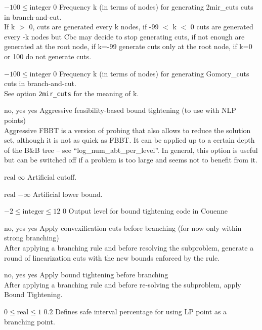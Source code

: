 %
{$-100\leq\textrm{integer}$}%
{$0$}%
{Frequency k (in terms of nodes) for generating 2mir\_cuts cuts in branch-and-cut.\\
If k $>$ 0, cuts are generated every k nodes, if -99 $<$ k $<$ 0 cuts are generated every -k nodes but Cbc may decide to stop generating cuts, if not enough are generated at the root node, if k=-99 generate cuts only at the root node, if k=0 or 100 do not generate cuts.}%
{}

%
{$-100\leq\textrm{integer}$}%
{$0$}%
{Frequency k (in terms of nodes) for generating Gomory\_cuts cuts in branch-and-cut.\\
See option \texttt{2mir\_cuts} for the meaning of k.}%
{}

%
{no, yes}%
{yes}%
{Aggressive feasibility-based bound tightening (to use with NLP points)\\
Aggressive FBBT is a version of probing that also allows to reduce the solution set, although it is not as quick as FBBT. It can be applied up to a certain depth of the B\&B tree -- see ``log\_num\_abt\_per\_level''. In general, this option is useful but can be switched off if a problem is too large and seems not to benefit from it.}%
{}

%
{$\textrm{real}$}%
{$\infty$}%
{Artificial cutoff.}%
{}

%
{$\textrm{real}$}%
{$-\infty$}%
{Artificial lower bound.}%
{}

%
{$-2\leq\textrm{integer}\leq12$}%
{$0$}%
{Output level for bound tightening code in Couenne}%
{}

%
{no, yes}%
{yes}%
{Apply convexification cuts before branching (for now only within strong branching)\\
After applying a branching rule and before resolving the subproblem, generate a round of linearization cuts with the new bounds enforced by the rule.}%
{}

%
{no, yes}%
{yes}%
{Apply bound tightening before branching\\
After applying a branching rule and before re-solving the subproblem, apply Bound Tightening.}%
{}

%
{$0\leq\textrm{real}\leq1$}%
{$0.2$}%
{Defines safe interval percentage for using LP point as a branching point.}%
{}

